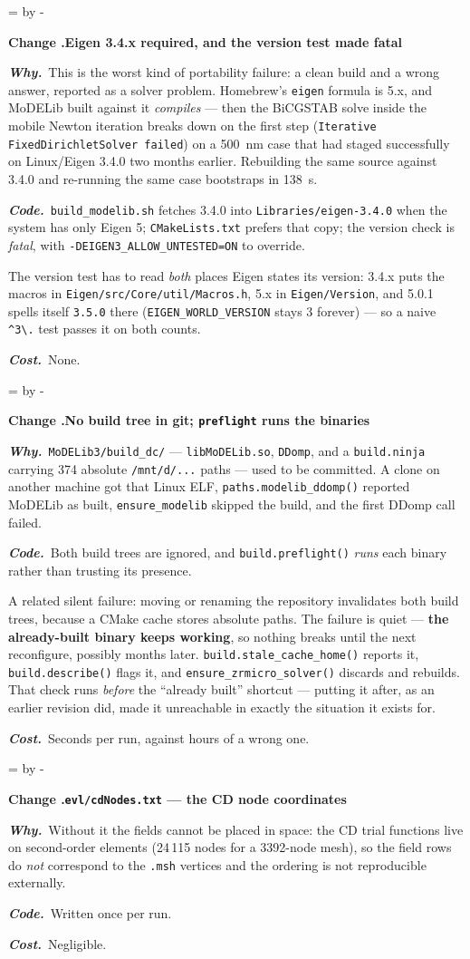 \documentclass[11pt,a4paper]{article}
\newcommand{\code}[1]{\texttt{\small #1}}
\newcommand{\needlines}[1]{%
  \par\dimen0=\pagegoal \advance\dimen0 by -\pagetotal
  \ifdim\dimen0<#1\baselineskip \newpage \fi}
\newcounter{chg}
\newcommand{\change}[1]{%
  \needlines{4}%
  \refstepcounter{chg}%
  \par\medskip\noindent
  {\bfseries\boldmath Change \thechg.\quad #1}%
  \par\nobreak\smallskip}
\newcommand{\why}[1]{\par\noindent\textbf{\itshape Why.}\ #1\par}
\newcommand{\impact}[1]{\par\noindent\textbf{\itshape Code.}\ #1\par}
\newcommand{\cost}[1]{\par\noindent\textbf{\itshape Cost.}\ #1\par}
\begin{document}
\change{Eigen 3.4.x required, and the version test made fatal}
\label{chg:eigen}
\why{This is the worst kind of portability failure: a clean build and a wrong
answer, reported as a solver problem. Homebrew's \code{eigen} formula is 5.x,
and MoDELib built against it \emph{compiles} --- then the BiCGSTAB solve inside
the mobile Newton iteration breaks down on the first step
(\code{Iterative FixedDirichletSolver failed}) on a 500~nm case that had staged
successfully on Linux/Eigen 3.4.0 two months earlier. Rebuilding the same
source against 3.4.0 and re-running the same case bootstraps in 138~s.}
\impact{\code{build\_modelib.sh} fetches 3.4.0 into
\code{Libraries/eigen-3.4.0} when the system has only Eigen 5;
\code{CMakeLists.txt} prefers that copy; the version check is \emph{fatal},
with \code{-DEIGEN3\_ALLOW\_UNTESTED=ON} to override.

The version test has to read \emph{both} places Eigen states its version:
3.4.x puts the macros in \code{Eigen/src/Core/util/Macros.h}, 5.x in
\code{Eigen/Version}, and 5.0.1 spells itself \code{3.5.0} there
(\code{EIGEN\_WORLD\_VERSION} stays 3 forever) --- so a naive
\code{\textasciicircum3\textbackslash.} test passes it on both counts.}
\cost{None.}

\change{No build tree in git; \code{preflight} runs the binaries}
\label{chg:preflight}
\why{\code{MoDELib3/build\_dc/} --- \code{libMoDELib.so}, \code{DDomp}, and a
\code{build.ninja} carrying 374 absolute \code{/mnt/d/...} paths --- used to be
committed. A clone on another machine got that Linux ELF,
\code{paths.modelib\_ddomp()} reported MoDELib as built, \code{ensure\_modelib}
skipped the build, and the first DDomp call failed.}
\impact{Both build trees are ignored, and \code{build.preflight()} \emph{runs}
each binary rather than trusting its presence.

A related silent failure: moving or renaming the repository invalidates both
build trees, because a CMake cache stores absolute paths. The failure is quiet
--- \textbf{the already-built binary keeps working}, so nothing breaks until the
next reconfigure, possibly months later. \code{build.stale\_cache\_home()}
reports it, \code{build.describe()} flags it, and
\code{ensure\_zrmicro\_solver()} discards and rebuilds. That check runs
\emph{before} the ``already built'' shortcut --- putting it after, as an earlier
revision did, made it unreachable in exactly the situation it exists for.}
\cost{Seconds per run, against hours of a wrong one.}

\change{\code{evl/cdNodes.txt} --- the CD node coordinates}
\label{chg:cdnodes}
\why{Without it the fields cannot be placed in space: the CD trial functions
live on second-order elements (24\,115 nodes for a 3392-node mesh), so the
field rows do \emph{not} correspond to the \code{.msh} vertices and the
ordering is not reproducible externally.}
\impact{Written once per run.}
\cost{Negligible.}
\end{document}
